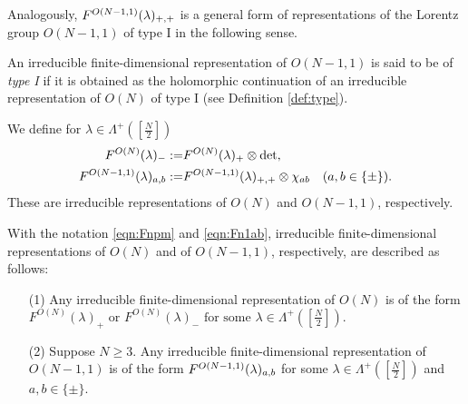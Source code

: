 Analogously, 
 $F^{{O(N-1,1)}}({\lambda})_{+,+}$ is a general form
 of representations of the Lorentz group $O(N-1,1)$
 of type I in the following sense.  
\begin{definition}
\label{def:typeone}
An irreducible
\newline
 finite-dimensional representation
 of $O(N-1,1)$ is said
 to be of {\it{type I}}
 if it is obtained as the holomorphic continuation
of an irreducible representation
 of $O(N)$
 of type I
 (see Definition \ref{def:type}).  
\end{definition}

We define for $\lambda \in \Lambda^+([\frac N2])$
\begin{align}
  F^{{O(N)}}({\lambda})_-
:=&
  F^{{O(N)}}({\lambda})_+ \otimes \det, 
\label{eqn:Fnpm}
\\
  F^{{O(N-1,1)}}({\lambda})_{a,b}
:=&
  F^{{O(N-1,1)}}({\lambda})_{+,+} \otimes \chi_{ab}
\quad
(a,b \in \{\pm\}).  
\label{eqn:Fn1ab}
\end{align}
These are irreducible representations
 of $O(N)$ and $O(N-1,1)$, 
respectively.  



With the notation \eqref{eqn:Fnpm} and \eqref{eqn:Fn1ab}, 
 irreducible finite-dimensional representations
 of $O(N)$ and of $O(N-1,1)$, 
 respectively,
 are described as follows:
\begin{lemma}
\label{lem:161612}
\begin{enumerate}
\item[{\rm{(1)}}]
Any irreducible finite-dimensional representation 
 of $O(N)$
 is of the form 
$
    \text{$F^{O(N)}(\lambda)_+$ or $F^{O(N)}(\lambda)_-$ for some $\lambda \in \Lambda^+([\frac N 2]).$}
$
\item[{\rm{(2)}}]
Suppose $N \ge 3$.  
Any irreducible finite-dimensional representation of $O(N-1,1)$
 is of the form
 $F^{{O(N-1,1)}}({\lambda})_{a,b}$ 
for some $\lambda \in \Lambda^+([\frac N 2])$
 and $a, b \in \{\pm\}$.  
\end{enumerate}
\end{lemma}

